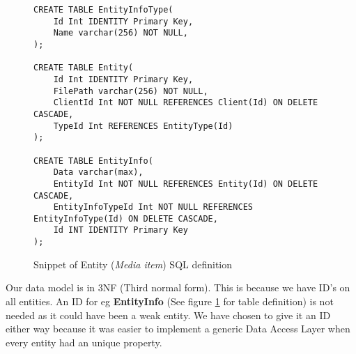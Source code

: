 \documentclass[../report.tex]{subfiles}
\begin{document}
\begin{figure}[H]
\begin{lstlisting}
CREATE TABLE EntityInfoType(
	Id Int IDENTITY Primary Key,
	Name varchar(256) NOT NULL,
);

CREATE TABLE Entity(
	Id Int IDENTITY Primary Key,
	FilePath varchar(256) NOT NULL,
	ClientId Int NOT NULL REFERENCES Client(Id) ON DELETE CASCADE,
	TypeId Int REFERENCES EntityType(Id)
);

CREATE TABLE EntityInfo(
	Data varchar(max),
	EntityId Int NOT NULL REFERENCES Entity(Id) ON DELETE CASCADE,
	EntityInfoTypeId Int NOT NULL REFERENCES EntityInfoType(Id) ON DELETE CASCADE,
	Id INT IDENTITY Primary Key
);
\end{lstlisting}
\caption{Snippet of Entity (\textit{Media item}) SQL definition}
\label{datamodel}
\end{figure}

Our data model is in 3NF (Third normal form). This is because we have ID's on all entities. An ID for eg \textbf{EntityInfo} (See figure \ref{datamodel} for table definition) is not needed as it could have been a weak entity. We have chosen to give it an ID either way because it was easier to implement a generic Data Access Layer when every entity had an unique property.
\end{document}
